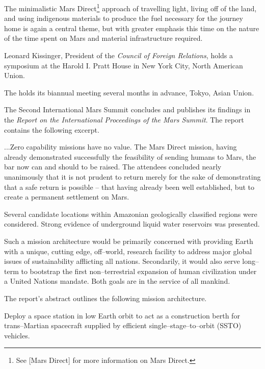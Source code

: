 The minimalistic Mars Direct\footnote{See [Mars Direct] for more information on Mars Direct.} approach of travelling light, living off of the land, and using indigenous materials to produce the fuel necessary for the journey home is again a central theme, but with greater emphasis this time on the nature of the time spent on Mars and material infrastructure required.
\StopTimelineDate

Leonard Kissinger, President of the {\it Council of Foreign Relations}, holds a symposium at the Harold I. Pratt House in New York City, North American Union.
\StopTimelineDate

The  holds its biannual meeting several months in advance, Tokyo, Asian Union.
\StopTimelineDate

The Second International Mars Summit concludes and publishes its findings in the {\it Report on the International Proceedings of the Mars Summit}. The report contains the following excerpt.

\startTimelineGeneralDocument
...Zero capability missions have no value. The Mars Direct mission, having already demonstrated successfully the feasibility of sending humans to Mars, the bar now can and should to be raised. The attendees concluded nearly unanimously that it is not prudent to return merely for the sake of demonstrating that a safe return is possible -- that having already been well established, but to create a permanent settlement on Mars. 

Several candidate locations within Amazonian geologically classified regions were considered. Strong evidence of underground liquid water reservoirs was presented.

Such a mission architecture would be primarily concerned with providing Earth with a unique, cutting edge, off--world, research facility to address major global issues of sustainability afflicting all nations. Secondarily, it would also serve long--term to bootstrap the first non--terrestrial expansion of human civilization under a United Nations mandate. Both goals are in the service of all mankind.
\stopTimelineGeneralDocument

The report's abstract outlines the following mission architecture.

\startitemize[R]
\item Deploy a space station in low Earth orbit to act as a construction berth for trans--Martian spacecraft supplied by efficient single--stage--to--orbit (SSTO) vehicles.

